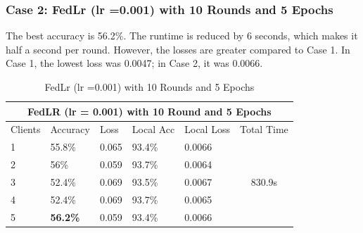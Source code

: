 \documentclass[conference]{IEEEtran}
\begin{document}
 \subsubsection{Case 2: FedLr (lr =0.001) with 10 Rounds and 5 Epochs}
 The best accuracy is 56.2\%. The runtime is reduced by 6 seconds, which makes it half a second per round. However, the losses are greater compared to Case 1. In Case 1, the lowest loss was 0.0047; in Case 2, it was 0.0066.  
 \begin{table}[ht]
 	\centering
 	\caption{FedLr (lr =0.001) with 10 Rounds and 5 Epochs}
 		\begin{tabular}{|lllllc|}
 			\hline
 			\multicolumn{6}{|c|}{FedLR (lr = 0.001) with 10 Round and 5 Epochs}                                                                                                                             \\ \hline
 			\multicolumn{1}{|l|}{Clients} & \multicolumn{1}{l|}{Accuracy} & \multicolumn{1}{l|}{Loss}  & \multicolumn{1}{l|}{Local Acc} & \multicolumn{1}{l|}{Local Loss} & \multicolumn{1}{l|}{Total Time} \\ \hline
 			\multicolumn{1}{|l|}{1}       & \multicolumn{1}{l|}{55.8\%}   & \multicolumn{1}{l|}{0.065} & \multicolumn{1}{l|}{93.4\%}    & \multicolumn{1}{l|}{0.0066}     & \multirow{5}{*}{830.9s}         \\ \cline{1-5}
 			\multicolumn{1}{|l|}{2}       & \multicolumn{1}{l|}{56\%}     & \multicolumn{1}{l|}{0.059} & \multicolumn{1}{l|}{93.7\%}    & \multicolumn{1}{l|}{0.0064}     &                                 \\ \cline{1-5}
 			\multicolumn{1}{|l|}{3}       & \multicolumn{1}{l|}{52.4\%}   & \multicolumn{1}{l|}{0.069} & \multicolumn{1}{l|}{93.5\%}    & \multicolumn{1}{l|}{0.0067}     &                                 \\ \cline{1-5}
 			\multicolumn{1}{|l|}{4}       & \multicolumn{1}{l|}{52.4\%}   & \multicolumn{1}{l|}{0.069} & \multicolumn{1}{l|}{93.7\%}    & \multicolumn{1}{l|}{0.0065}     &                                 \\ \cline{1-5}
 			\multicolumn{1}{|l|}{5}       & \multicolumn{1}{l|}{\textbf{56.2\%}}   & \multicolumn{1}{l|}{0.059} & \multicolumn{1}{l|}{93.4\%}    & \multicolumn{1}{l|}{0.0066}     &                                 \\ \hline
 		\end{tabular}%
 \end{table}
 
\end{document}
